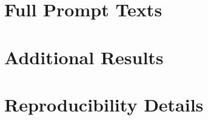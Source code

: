\chapter{Full Prompt Texts}
\label{app:prompts}

\chapter{Additional Results}
\label{app:results}

\chapter{Reproducibility Details}
\label{app:repro}

